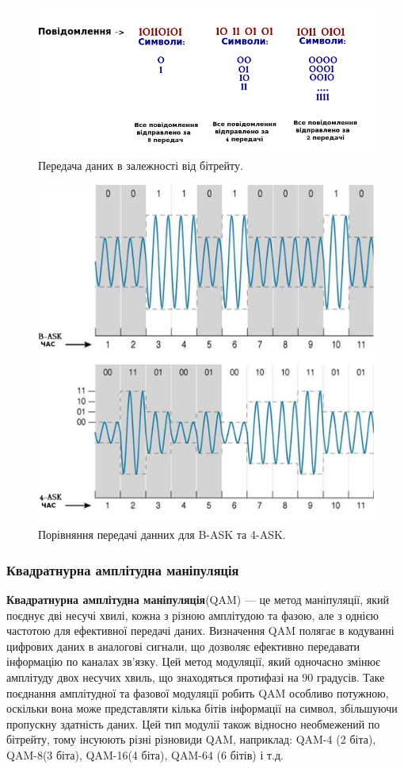 \documentclass{article}
\begin{document}
\begin{figure}[h!]
	\centering
	\includegraphics[width=0.8\linewidth]{images/transmittion_speed.png}
	\caption{\label{fig:transmittion_speed} Передача даних в залежності від бітрейту.}
\end{figure}

\begin{figure}[h!]
	\centering
	\includegraphics[width=0.7\linewidth]{images/comparison-bask-vs-4ask.png}
	\caption{\label{fig:comparison-bask-vs-4ask} Порівняння передачі данних для B-ASK та 4-ASK.}
\end{figure}


\newpage
\subsubsection{Квадратнурна амплітудна маніпуляція}
\textbf{Квадратнурна амплітудна маніпуляція}(QAM) --- це метод маніпуляції, який поєднує дві несучі хвилі, кожна з різною амплітудою та фазою, але з однією частотою для ефективної передачі даних. Визначення QAM полягає в кодуванні цифрових даних в аналогові сигнали, що дозволяє ефективно передавати інформацію по каналах зв'язку. Цей метод модуляції, який одночасно змінює амплітуду двох несучих хвиль, що знаходяться протифазі на 90 градусів. Таке поєднання амплітудної та фазової модуляції робить QAM особливо потужною, оскільки вона може представляти кілька бітів інформації на символ, збільшуючи пропускну здатність даних. Цей тип модулії також відносно необмежений по бітрейту, тому інсуюють різні різновиди QAM, наприклад: QAM-4 (2 біта), QAM-8(3 біта), QAM-16(4 біта), QAM-64 (6 бітів) і т.д.
\end{document}
